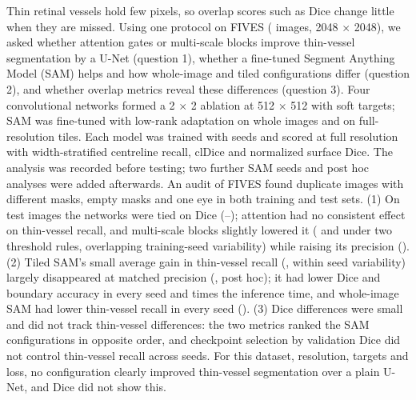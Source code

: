 Thin retinal vessels hold few pixels, so overlap scores such as Dice change little when they are missed. Using one protocol on
FIVES (\NImages{} images, 2048 $\times$ 2048), we asked whether
attention gates or multi-scale blocks improve thin-vessel segmentation by a U-Net (question 1), whether a fine-tuned Segment
Anything Model (SAM) helps and how whole-image and tiled configurations differ (question 2), and whether overlap metrics
reveal these differences (question 3). Four convolutional networks formed a 2 $\times$ 2 ablation at 512 $\times$ 512 with
soft targets; SAM was fine-tuned with low-rank adaptation on whole images and on
full-resolution tiles. Each model was trained with \NSeeds{} seeds and scored at full
resolution with width-stratified centreline recall, clDice and normalized surface Dice. The analysis was recorded before
testing; two further SAM seeds and post hoc analyses were added afterwards. An audit of FIVES
found duplicate images with different masks, empty masks and one eye in both training and test sets. (1) On
\NTestImages{} test images the networks were tied on Dice (\CNNDiceMin--\CNNDiceMax); attention had no consistent effect
on thin-vessel recall, and multi-scale blocks slightly lowered it (\AblMSThinSel{} and \AblMSThinFix{} under two threshold
rules, overlapping training-seed variability) while raising its precision (\PHStMSWPrecSel). (2) Tiled SAM's small average
gain in thin-vessel recall (\SAMTiledThinDiff, within seed variability) largely disappeared at matched precision
(\PHStTiledThinMatch, post hoc); it had lower Dice and boundary accuracy in every seed and \SAMTiledInfRatio{} times the
inference time, and whole-image SAM had lower thin-vessel recall in every seed (\SAMWholeThinDiff). (3) Dice differences
were small and did not track thin-vessel differences: the two metrics ranked the SAM configurations in opposite order, and
checkpoint selection by validation Dice did not control thin-vessel recall across seeds. For this dataset, resolution,
targets and loss, no configuration clearly improved thin-vessel segmentation over a plain U-Net, and Dice did not show
this.
